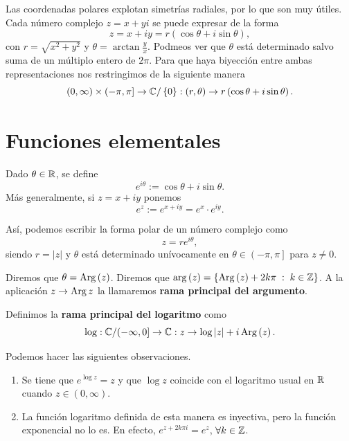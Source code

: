 \begin{notation}
Las coordenadas polares explotan simetrías radiales, por lo que son muy útiles. Cada número complejo $\displaystyle z = x + yi $ se puede expresar de la forma 
\[z = x + iy = r\left(\cos\theta + i \sin \theta \right) ,\]
con $\displaystyle r = \sqrt{x^{2}+y^{2}} $ y $\displaystyle \theta = \arctan\frac{y}{x} $. Podmeos ver que $\displaystyle \theta $ está determinado salvo suma de un múltiplo entero de $\displaystyle 2\pi  $. Para que haya biyección entre ambas representaciones nos restringimos de la siguiente manera
\[\left(0,\infty\right)\times\left(-\pi, \pi \right] \to \mathbb{C}/ \left\{ 0\right\} : \left(r, \theta \right)\to r\left(\cos\theta + i \sin \theta\right) .\]
\end{notation}

\section{Funciones elementales}
\begin{definition}
Dado $\displaystyle \theta \in \mathbb{R} $, se define
\[e^{i\theta }:= \cos \theta + i \sin \theta  .\]
Más generalmente, si $\displaystyle z = x + iy $ ponemos
\[e^{z}:= e^{x +iy}=e^{x} \cdot e^{iy} .\]
\end{definition}

Así, podemos escribir la forma polar de un número complejo como
\[z = re^{i\theta} ,\]
siendo $\displaystyle r = \left|z\right| $ y $\displaystyle \theta $ está determinado unívocamente en $\displaystyle \theta \in \left(-\pi , \pi \right]  $ para $\displaystyle z \neq 0 $. 
\begin{notation}
Diremos que $\displaystyle \theta = \operatorname{Arg}\left(z \right) $. Diremos que $\displaystyle \arg\left(z\right)= \left\{ \operatorname{Arg}\left(z\right)+2k\pi \; : \; k \in \mathbb{Z}\right\}  $. A la aplicación $\displaystyle z \to \operatorname{Arg} z $ la llamaremos \textbf{rama principal del argumento}. 
\end{notation}
\begin{definition}
Definimos la \textbf{rama principal del logaritmo} como
\[\log : \mathbb{C} / (-\infty, 0] \to \mathbb{C} : z \to \log \left|z\right| + i \operatorname{Arg}\left(z\right) .\]
\end{definition}
\begin{observation}
	Podemos hacer las siguientes observaciones.
	\begin{enumerate}
		\item Se tiene que $\displaystyle e ^{\log z}=z $ y que $\displaystyle \log z $ coincide con el logaritmo usual en $\displaystyle \mathbb{R} $ cuando $\displaystyle z \in \left(0, \infty\right) $.
		\item La función logaritmo definida de esta manera es inyectiva, pero la función exponencial no lo es. En efecto, $\displaystyle e^{z + 2k\pi i}=e^{z} $, $\displaystyle \forall k \in \mathbb{Z} $. 
	\end{enumerate} 
\end{observation}

